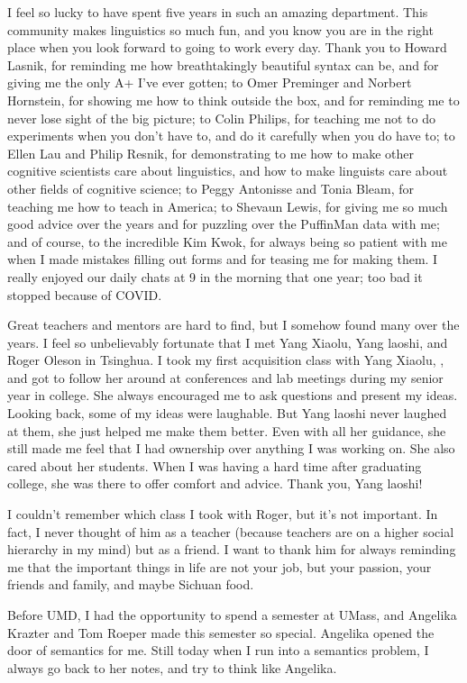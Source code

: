 I feel so lucky to have spent five years in such an amazing department. This community makes linguistics so much fun, and you know you are in the right place when you look forward to going to work every day. Thank you to Howard Lasnik, for reminding me how breathtakingly beautiful syntax can be, and for giving me the only A+ I’ve ever gotten; to Omer Preminger and Norbert Hornstein, for showing me how to think outside the box, and for reminding me to never lose sight of the big picture; to Colin Philips, for teaching me not to do experiments when you don’t have to, and do it carefully when you do have to; to Ellen Lau and Philip Resnik, for demonstrating to me how to make other cognitive scientists care about linguistics, and how to make linguists care about other fields of cognitive science; to Peggy Antonisse and Tonia Bleam, for teaching me how to teach in America; to Shevaun Lewis, for giving me so much good advice over the years and for puzzling over the PuffinMan data with me; and of course, to the incredible Kim Kwok, for always being so patient with me when I made mistakes filling out forms and for teasing me for making them. I really enjoyed our daily chats at 9 in the morning that one year; too bad it stopped because of COVID.
 
Great teachers and mentors are hard to find, but I somehow found many over the years. I feel so unbelievably fortunate that I met Yang Xiaolu, Yang laoshi, and Roger Oleson in Tsinghua. I took my first acquisition class with Yang Xiaolu, , and got to follow her around at conferences and lab meetings during my senior year in college. She always encouraged me to ask questions and present my ideas. Looking back, some of my ideas were laughable. But Yang laoshi never laughed at them, she just helped me make them better. Even with all her guidance, she still made me feel that I had ownership over anything I was working on. She also cared about her students. When I was having a hard time after graduating college, she was there to offer comfort and advice. Thank you, Yang laoshi! 

I couldn’t remember which class I took with Roger, but it’s not important. In fact, I never thought of him as a teacher (because teachers are on a higher social hierarchy in my mind) but as a friend. I want to thank him for always reminding me that the important things in life are not your job, but your passion, your friends and family, and maybe Sichuan food.
 
Before UMD, I had the opportunity to spend a semester at UMass, and Angelika Krazter and Tom Roeper made this semester so special. Angelika opened the door of semantics for me. Still today when I run into a semantics problem, I always go back to her notes, and try to think like Angelika. 

